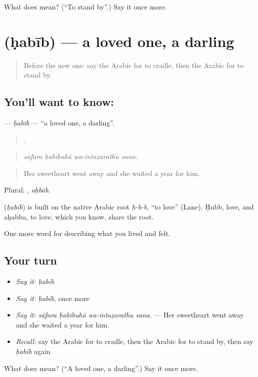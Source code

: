\begin{tcolorbox}[breakable,colback=teal!4,colframe=teal!35!black,title={Before you move on}]
What does  mean? (\textquotedblleft{}To stand by\textquotedblright{}.) Say it once more.
\end{tcolorbox}
\section[\texorpdfstring{\ar{حبيب} (ḥabīb)}{حبيب (ḥabīb)}]{ (ḥabīb) — a loved one, a darling}

\label{lesson:AR-C533-habib}



\begin{quote}
Before the new one: say the Arabic for to cradle, then the Arabic for to stand by.
\end{quote}

\subsection*{You'll want to know: }
\textbf{} — \emph{ḥabīb} — \textquotedblleft{}a loved one, a darling\textquotedblright{}.

\begin{quote}
   .
\end{quote}

\begin{quote}
\emph{sāfara ḥabībuhā wa-intaẓarathu sana.}
\end{quote}

\begin{quote}
Her sweetheart went away and she waited a year for him.
\end{quote}

Plural: , \emph{aḥbāb}.

\begin{cousinweb}
\textbf{} (\emph{ḥabīb}) is built on the native Arabic root \emph{ḥ-b-b}, \textquotedblleft{}to love\textquotedblright{} (Lane). Ḥubb, love, and aḥabba, to love, which you know, share the root.
\end{cousinweb}

\begin{grammarlens}[title={What you've built}]
One more word for describing what you lived and felt.
\end{grammarlens}

\subsection*{Your turn}
\begin{itemize}
\raggedright
  \item \emph{Say it:} \emph{ḥabīb}
  \item \emph{Say it:} \emph{ḥabīb}, once more
  \item \emph{Say it:} \emph{sāfara ḥabībuhā wa-intaẓarathu sana.} — Her sweetheart went away and she waited a year for him.
  \item \emph{Recall:} say the Arabic for to cradle, then the Arabic for to stand by, then say \emph{ḥabīb} again
\end{itemize}

\begin{tcolorbox}[breakable,colback=teal!4,colframe=teal!35!black,title={Before you move on}]
What does  mean? (\textquotedblleft{}A loved one, a darling\textquotedblright{}.) Say it once more.
\end{tcolorbox}
